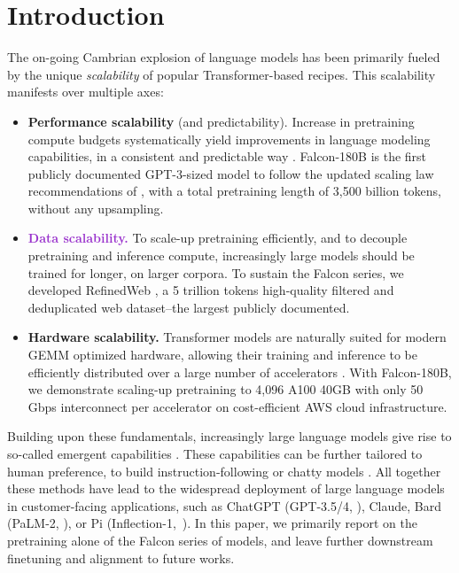 \documentclass{article}
\DeclareRobustCommand{\performance}[1]{\textcolor{JungleGreen}{#1}}
\DeclareRobustCommand{\data}[1]{\textcolor{DarkOrchid}{#1}}
\DeclareRobustCommand{\hardware}[1]{\textcolor{Mahogany}{#1}}
\begin{document}
\newpage

\section{Introduction}

The on-going Cambrian explosion of language models has been primarily fueled by the unique \emph{scalability} of popular Transformer-based recipes. This scalability manifests over multiple axes:
\begin{itemize}
    \item{\textbf{\performance{Performance scalability}} (and predictability).} Increase in pretraining compute budgets systematically yield improvements in language modeling capabilities, in a consistent and predictable way \citep{kaplan2020scaling}. Falcon-180B is the first publicly documented GPT-3-sized model to follow the updated scaling law recommendations of \citet{hoffmann2022training}, with a total pretraining length of 3,500 billion tokens, without any upsampling.
    \item{\textbf{\data{Data scalability.}}} To scale-up pretraining efficiently, and to decouple pretraining and inference compute, increasingly large models should be trained for longer, on larger corpora. To sustain the Falcon series, we developed RefinedWeb \citep{refinedweb}, a 5 trillion tokens high-quality filtered and deduplicated web dataset--the largest publicly documented.
    \item{\textbf{\hardware{Hardware scalability.}}} Transformer models \citep{vaswani2017attention} are naturally suited for modern GEMM optimized hardware, allowing their training and inference to be efficiently distributed over a large number of accelerators \citep{megatron-2, pope2023efficiently}. With Falcon-180B, we demonstrate scaling-up pretraining to 4,096 A100 40GB with only 50 Gbps interconnect per accelerator on cost-efficient AWS cloud infrastructure.
\end{itemize}

Building upon these fundamentals, increasingly large language models give rise to so-called emergent capabilities \citep{wei2022emergent}. These capabilities can be further tailored to human preference, to build instruction-following or chatty models \citep{ouyang2022training}. All together these methods have lead to the widespread deployment of large language models in customer-facing applications, such as ChatGPT (GPT-3.5/4, \citet{gpt-4}), Claude, Bard (PaLM-2, \citet{palm-2}), or Pi (Inflection-1,~\citet{inflection-1}). In this paper, we primarily report on the pretraining alone of the Falcon series of models, and leave further downstream finetuning and alignment to future works.
\end{document}
